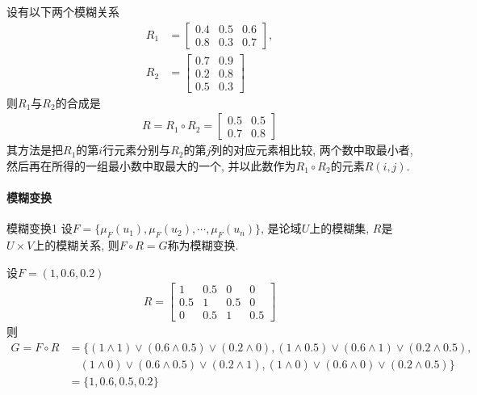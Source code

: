 \begin{example}
设有以下两个模糊关系
\begin{align*}
  R_{1}&=\left[\begin{array}{ccc}{0.4} & {0.5} & {0.6} \\ {0.8} & {0.3} & {0.7}\end{array}\right],\\
  R_{2}&=\left[\begin{array}{cc}{0.7} & {0.9} \\ {0.2} & {0.8} \\ {0.5} & {0.3}\end{array}\right]
\end{align*}
则$R_1$与$R_2$的合成是
\begin{align}
  R=R_{1} \circ R_{2}=\left[\begin{array}{ll}{0.5} & {0.5} \\ {0.7} & {0.8}\end{array}\right]
\end{align}
其方法是把$R_1$的第$i$行元素分别与$R_2$的第$j$列的对应元素相比较, 两个数中取最小者, 然后再在所得的一组最小数中取最大的一个, 并以此数作为$R_1\circ R_2$的元素$R(i,j)$. \end{example}
\paragraph{模糊变换}
\begin{mydef}{模糊变换}{1}
设$F=\{\mu_F(u_1),\mu_F(u_2),\cdots, \mu_F(u_n)\}$, 是论域$U$上的模糊集, $R$是$U\times V$上的模糊关系, 则$F\circ R=G$称为模糊变换.
\end{mydef}
\begin{example}
设$F=(1, 0.6, 0.2)$
\begin{align}
  R=\left[\begin{array}{cccc}
  {1} & {0.5} & {0} & {0} \\
  {0.5} & {1} & {0.5} & {0} \\
  {0} & {0.5} & {1} & {0.5}
  \end{array}\right]
\end{align}
则
\begin{align*}
  G=F\circ R&=\{(1\wedge 1)\vee (0.6\wedge 0.5)\vee (0.2\wedge 0), (1\wedge 0.5)\vee (0.6\wedge 1)\vee (0.2\wedge 0.5),\\
    &\quad  (1\wedge 0)\vee (0.6\wedge 0.5)\vee (0.2\wedge 1), (1\wedge 0)\vee (0.6\wedge 0)\vee (0.2\wedge 0.5)\}\\
        & =\{1, 0.6, 0.5, 0.2\}
\end{align*}
\end{example}
